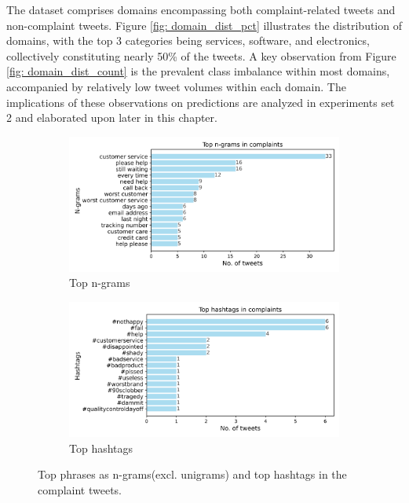 The dataset comprises domains encompassing both complaint-related tweets and non-complaint tweets. Figure \ref{fig: domain_dist_pct} illustrates the distribution of domains, with the top 3 categories being services, software, and electronics, collectively constituting nearly 50\% of the tweets. A key observation from Figure \ref{fig: domain_dist_count} is the prevalent class imbalance within most domains, accompanied by relatively low tweet volumes within each domain. The implications of these observations on predictions are analyzed in experiments set 2 and elaborated upon later in this chapter.

\begin{figure}[htbp]
    \centering
    \captionsetup{font=small}
    \begin{subfigure}{0.49\textwidth}
        \centering
        \includegraphics[width=\linewidth]{figures/top_ngram_horiz_bar.png}
        \caption{Top n-grams}
        \label{fig: top_ngrams}
    \end{subfigure}
    \hfill
    \begin{subfigure}{0.49\textwidth}
        \centering
        \includegraphics[width=\linewidth]{figures/top_hash_horiz_bar.png}
        \caption{Top hashtags}
        \label{fig: top_hashtags}
    \end{subfigure}
    \caption{Top phrases as n-grams(excl. unigrams) and top hashtags in the complaint tweets.}
    \label{fig: top_ngrams_hashtags}
\end{figure}

